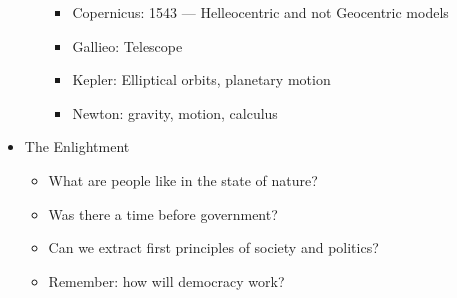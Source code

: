 \documentclass[letterpaper]{article}
\begin{document}
\begin{itemize}
\begin{itemize}
\begin{itemize}
\item Copernicus: 1543 --- Helleocentric and not Geocentric models
\item Gallieo: Telescope
\item Kepler: Elliptical orbits, planetary motion
\item Newton: gravity, motion, calculus
\end{itemize}
\end{itemize}

\item The Enlightment

\begin{itemize}
\item What are people like in the state of nature?
\item Was there a time before government?
\item Can we extract first principles of society and politics?
\item Remember: how will democracy work?
\end{itemize}
\end{itemize}
\end{document}
